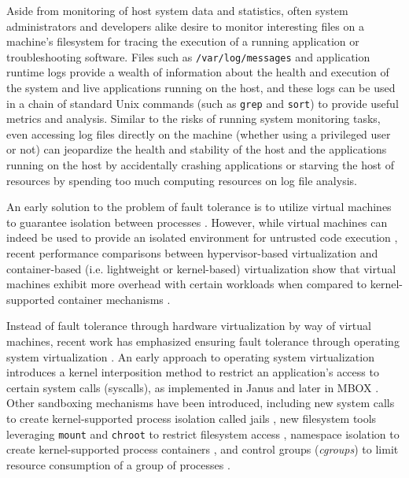 \documentclass{proc}
\begin{document}
Aside from monitoring of host system data and statistics, often system administrators and developers alike desire to monitor interesting files on a machine's filesystem for tracing the execution of a running application or troubleshooting software. Files such as \texttt{/var/log/messages} and application runtime logs provide a wealth of information about the health and execution of the system and live applications running on the host, and these logs can be used in a chain of standard Unix commands (such as \texttt{grep} and \texttt{sort}) to provide useful metrics and analysis. Similar to the risks of running system monitoring tasks, even accessing log files directly on the machine (whether using a privileged user or not) can jeopardize the health and stability of the host and the applications running on the host by accidentally crashing applications or starving the host of resources by spending too much computing resources on log file analysis.

An early solution to the problem of fault tolerance is to utilize virtual machines to guarantee isolation between processes \cite{garfinkel2003terra}. However, while virtual machines can indeed be used to provide an isolated environment for untrusted code execution \cite{wen2012virtualization}, recent performance comparisons between hypervisor-based virtualization and container-based (i.e. lightweight or kernel-based) virtualization show that virtual machines exhibit more overhead with certain workloads when compared to kernel-supported container mechanisms \cite{felter2014docker, morabito2015hypervisors}.

Instead of fault tolerance through hardware virtualization by way of virtual machines, recent work has emphasized ensuring fault tolerance through operating system virtualization \cite{soltesz2007container}. An early approach to operating system virtualization introduces a kernel interposition method to restrict an application's access to certain system calls (syscalls), as implemented in Janus \cite{goldberg1996janus} and later in MBOX \cite{kim2013mbox}. Other sandboxing mechanisms have been introduced, including new system calls to create kernel-supported process isolation called jails \cite{kamp2000jails}, new filesystem tools leveraging \texttt{mount} and \texttt{chroot} to restrict filesystem access \cite{prevelakis2001fmac}, namespace isolation to create kernel-supported process containers \cite{biederman2006namespaces, menage2007containers}, and control groups (\textit{cgroups}) to limit resource consumption of a group of processes \cite{menagecgroups}.
\end{document}
